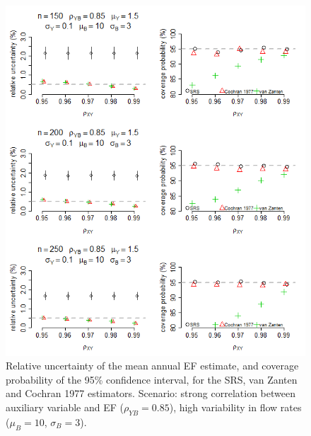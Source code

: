 \begin{figure}[h]
	\centering
	\includegraphics[width=\textwidth]{graphs/Results_Combined_withoutBoot_HighFlowRateVar_corB250.png}
	\caption{Relative uncertainty of the mean annual EF estimate, and coverage probability of the 95\% confidence interval, for the SRS, van Zanten and Cochran 1977 estimators. Scenario: strong correlation between auxiliary variable and EF ($\rho_{YB}=0.85$), high variability in flow rates ($\mu_B=10$, $\sigma_B=3$).}
	\label{fig:Batch5}
\end{figure}

